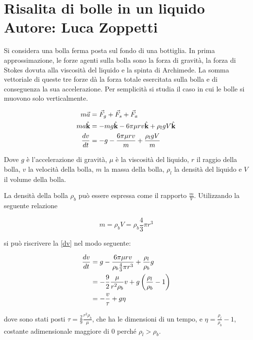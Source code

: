 \documentclass{article}
\newcommand{\uvec}[1]{\hat{\textbf{#1}}}
\begin{document}
\section*{Risalita di bolle in un liquido\\{\large Autore: Luca Zoppetti}}

Si considera una bolla ferma posta sul fondo di una bottiglia. In prima approssimazione, le forze agenti sulla bolla sono la forza di gravità, la forza di Stokes dovuta alla viscosità del liquido e la spinta di Archimede. La somma vettoriale di queste tre forze dà la forza totale esercitata sulla bolla e di conseguenza la sua accelerazione. Per semplicità si studia il caso in cui le bolle si muovono solo verticalmente.

\begin{align}\label{dv}
    m\vec{a} &= \vec{F}_g + \vec{F}_s + \vec{F}_a\notag\\
    ma\uvec{k} &= -mg\uvec{k} - 6\pi\mu r v \uvec{k} + \rho_l g V \uvec{k}\notag\\
    \frac{dv}{dt} &= -g - \frac{6\pi\mu r v}{m} + \frac{\rho_l g V}{m}
\end{align}

\noindent Dove $g$ è l'accelerazione di gravità, $\mu$ è la viscosità del liquido, $r$ il raggio della bolla, $v$ la velocità della bolla, $m$ la massa della bolla, $\rho_l$ la densità del liquido e $V$ il volume della bolla.

La densità della bolla $\rho_b$ può essere espressa come il rapporto $\frac{m}{V}$. Utilizzando la seguente relazione

\begin{equation*}
    m = \rho_b V = \rho_b \frac{4}{3} \pi r^3
\end{equation*}

\noindent si può riscrivere la \eqref{dv} nel modo seguente:

\begin{align}\label{eq2}
    \frac{dv}{dt} &= g - \frac{6 \pi \mu r v}{\rho_b \frac{4}{3}\pi r^3} + \frac{\rho_l}{\rho_b}g\notag\\
    &= - \frac{9}{2} \frac{\mu}{r^2 \rho_b}v + g \left( \frac{\rho_l}{\rho_b} - 1 \right)\notag\\
    &= -\frac{v}{\tau} + g\eta
\end{align}

\noindent dove sono stati posti $\tau = \frac{2}{9} \frac{r^2 \rho_b}{\mu}$, che ha le dimensioni di un tempo, e $\eta = \frac{\rho_l}{\rho_b} - 1$, costante adimensionale maggiore di $0$ perché $\rho_l > \rho_b$.
\end{document}
